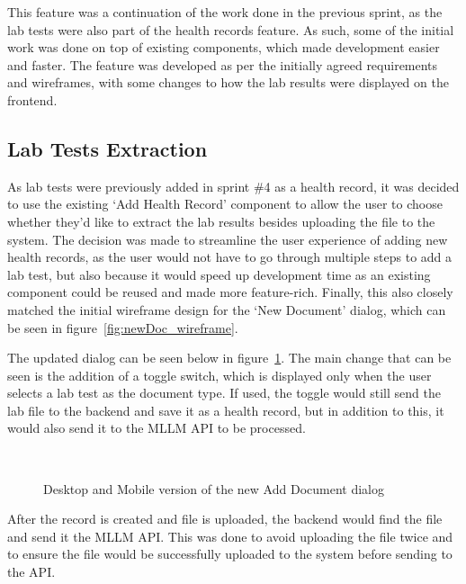 This feature was a continuation of the work done in the previous sprint, as the lab tests were also part of the health records feature. As such, some of the initial work was done on top of existing components, which made development easier and faster. The feature was developed as per the initially agreed requirements and wireframes, with some changes to how the lab results were displayed on the frontend.

\subsection{Lab Tests Extraction}

As lab tests were previously added in sprint \#4 as a health record, it was decided to use the existing `Add Health Record' component to allow the user to choose whether they'd like to extract the lab results besides uploading the file to the system. The decision was made to streamline the user experience of adding new health records, as the user would not have to go through multiple steps to add a lab test, but also because it would speed up development time as an existing component could be reused and made more feature-rich. Finally, this also closely matched the initial wireframe design for the `New Document' dialog, which can be seen in figure~\ref{fig:newDoc_wireframe}.

The updated dialog can be seen below in figure~\ref{fig:labs_addDoc}. The main change that can be seen is the addition of a toggle switch, which is displayed only when the user selects a lab test as the document type. If used, the toggle would still send the lab file to the backend and save it as a health record, but in addition to this, it would also send it to the MLLM API to be processed. 

\begin{figure}[ht]
  \centering
  \\[\baselineskip]
  \caption{Desktop and Mobile version of the new Add Document dialog}\label{fig:labs_addDoc}
\end{figure}

\FloatBarrier{}

After the record is created and file is uploaded, the backend would find the file and send it the MLLM API\@. This was done to avoid uploading the file twice and to ensure the file would be successfully uploaded to the system before sending to the API\@.

